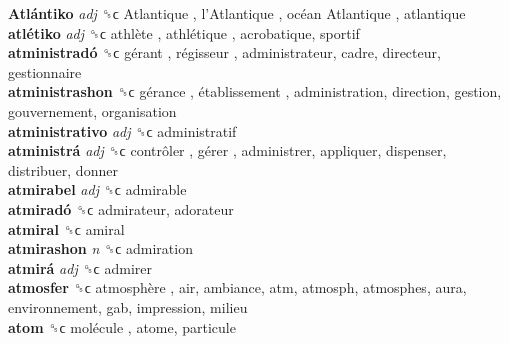 \textbf{Atlántiko} \emph{adj}  ␝ϲ   Atlantique ,  l’Atlantique ,  océan Atlantique , atlantique  \\
\textbf{atlétiko} \emph{adj}  ␝ϲ   athlète ,  athlétique , acrobatique, sportif  \\
\textbf{atministradó} ␝ϲ   gérant ,  régisseur , administrateur, cadre, directeur, gestionnaire  \\
\textbf{atministrashon} ␝ϲ   gérance ,  établissement , administration, direction, gestion, gouvernement, organisation  \\
\textbf{atministrativo} \emph{adj}  ␝ϲ  administratif  \\
\textbf{atministrá} \emph{adj}  ␝ϲ   contrôler ,  gérer , administrer, appliquer, dispenser, distribuer, donner  \\
\textbf{atmirabel} \emph{adj}  ␝ϲ  admirable  \\
\textbf{atmiradó} ␝ϲ  admirateur, adorateur  \\
\textbf{atmiral} ␝ϲ  amiral  \\
\textbf{atmirashon} \emph{n}  ␝ϲ  admiration  \\
\textbf{atmirá} \emph{adj}  ␝ϲ  admirer  \\
\textbf{atmosfer} ␝ϲ   atmosphère , air, ambiance, atm, atmosph, atmosphes, aura, environnement, gab, impression, milieu  \\
\textbf{atom} ␝ϲ   molécule , atome, particule  \\
